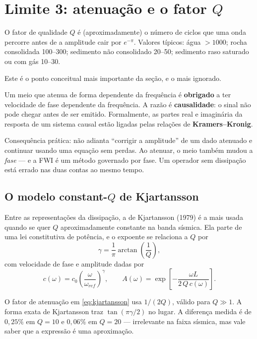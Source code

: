 \documentclass[11pt,a4paper,oneside]{report}
\begin{document}
\section{Limite 3: atenuação e o fator $Q$}

O fator de qualidade $Q$ é (aproximadamente) o número de ciclos que uma onda
percorre antes de a amplitude cair por $e^{-\pi}$. Valores típicos: água
$>1000$; rocha consolidada 100--300; sedimento não consolidado 20--50;
sedimento raso saturado ou com gás 10--30.

\begin{teoria}
Este é o ponto conceitual mais importante da seção, e o mais ignorado.

Um meio que atenua de forma dependente da frequência é \textbf{obrigado} a ter
velocidade de fase dependente da frequência. A razão é \textbf{causalidade}: o
sinal não pode chegar antes de ser emitido. Formalmente, as partes real e
imaginária da resposta de um sistema causal estão ligadas pelas relações de
\textbf{Kramers--Kronig}.

Consequência prática: não adianta ``corrigir a amplitude'' de um dado atenuado
e continuar usando uma equação sem perdas. Ao atenuar, o meio também mudou a
\emph{fase} --- e a FWI é um método governado por fase. Um operador sem
dissipação está errado nas duas contas ao mesmo tempo.
\end{teoria}

\subsection*{O modelo constant-$Q$ de Kjartansson}

Entre as representações da dissipação, a de Kjartansson (1979) é a mais usada
quando se quer $Q$ aproximadamente constante na banda sísmica. Ela parte de
uma lei constitutiva de potência, e o expoente se relaciona a $Q$ por
\begin{equation}
\gamma = \frac{1}{\pi}\arctan\!\left(\frac{1}{Q}\right),
\label{eq:gamma}
\end{equation}
com velocidade de fase e amplitude dadas por
\begin{equation}
c(\omega) = c_0\left(\frac{\omega}{\omega_{ref}}\right)^{\gamma},
\qquad
A(\omega) = \exp\!\left[-\frac{\omega L}{2\,Q\,c(\omega)}\right].
\label{eq:kjartansson}
\end{equation}

\begin{atencao}
O fator de atenuação em \eqref{eq:kjartansson} usa $1/(2Q)$, válido para
$Q \gg 1$. A forma exata de Kjartansson traz $\tan(\pi\gamma/2)$ no lugar. A
diferença medida é de $0{,}25\%$ em $Q=10$ e $0{,}06\%$ em $Q=20$ ---
irrelevante na faixa sísmica, mas vale saber que a expressão é uma aproximação.
\end{atencao}
\end{document}
